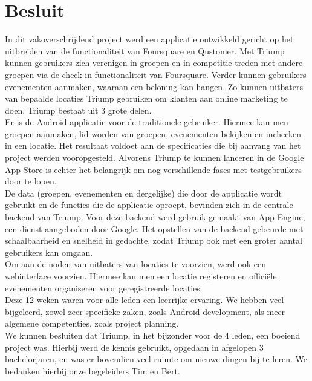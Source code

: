 
\chapter{Besluit}%

In dit vakoverschrijdend project werd een applicatie ontwikkeld gericht op het uitbreiden van de functionaliteit van Foursquare en Qustomer.
Met Triump kunnen gebruikers zich verenigen in groepen en in competitie treden met andere groepen via de check-in functionaliteit van Foursquare.
Verder kunnen gebruikers evenementen aanmaken, waaraan een beloning kan hangen. Zo kunnen uitbaters van bepaalde locaties Triump gebruiken om klanten aan online marketing te doen.
Triump bestaat uit 3 grote delen.\\
Er is de Android applicatie voor de traditionele gebruiker. Hiermee kan men groepen aanmaken, lid worden van groepen, evenementen bekijken en inchecken in een locatie.
Het resultaat voldoet aan de specificaties die bij aanvang van het project werden vooropgesteld. Alvorens Triump te kunnen lanceren in de Google App Store is echter het belangrijk om nog verschillende fases met testgebruikers door te lopen.\\
De data (groepen, evenementen en dergelijke) die door de applicatie wordt gebruikt en de functies die de applicatie oproept, bevinden zich in de centrale backend van Triump.
Voor deze backend werd gebruik gemaakt van App Engine, een dienst aangeboden door Google.
Het opstellen van de backend gebeurde met schaalbaarheid en snelheid in gedachte, zodat Triump ook met een groter aantal gebruikers kan omgaan.\\
Om aan de noden van uitbaters van locaties te voorzien, werd ook een webinterface voorzien. 
Hiermee kan men een locatie registeren en officiële evenementen organiseren voor geregistreerde locaties.\\
Deze 12 weken waren voor alle leden een leerrijke ervaring. We hebben veel bijgeleerd, zowel zeer specifieke zaken, zoals Android development, als meer algemene competenties, zoals project planning.\\
We kunnen besluiten dat Triump, in het bijzonder voor de 4 leden, een boeiend project was. Hierbij werd de kennis gebruikt, opgedaan in afgelopen 3 bachelorjaren, en was er bovendien veel ruimte om nieuwe dingen bij te leren.
We bedanken hierbij onze begeleiders Tim en Bert.
